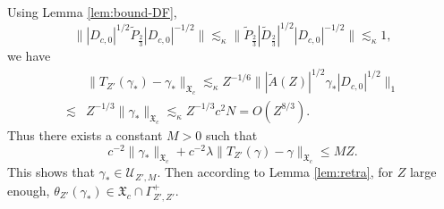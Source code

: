 \documentclass[a4paper]{amsart}
\def\cU{{\mathcal U}}
\def\gX{\mathfrak{X}}
\begin{document}
Using Lemma \ref{lem:bound-DF},
\begin{equation}\label{eq:4.2}
    \||D_{c,0}|^{1/2}\widetilde{P}_{\frac23} |D_{c,0}|^{-1/2}\|\lesssim_\kappa \|\widetilde{P}_{\frac23}|\widetilde{D}_{\frac23}|^{1/2} |D_{c,0}|^{-1/2}\|\lesssim_\kappa 1,
\end{equation}
we have
\begin{equation}\label{eq:T2/3-gamma}
  \begin{split}
    &\| T_{Z'}(\gamma_{*})-\gamma_{*}\|_{\gX_c}\lesssim_\kappa Z^{-1/6}\||\widetilde{A}(Z)|^{1/2} \gamma_*|D_{c,0}|^{1/2}\|_1\\
    \lesssim& Z^{-1/3}\|\gamma_*\|_{\gX_c}\lesssim_\kappa Z^{-1/3} c^2N =O(Z^{8/3}).
  \end{split}
\end{equation}
Thus there exists a constant $M>0$ such that
\begin{equation}
    c^{-2}\|\gamma_*\|_{\gX_c}+c^{-2}\lambda \|T_{Z'}(\gamma)-\gamma\|_{\gX_c}\leq MZ.
\end{equation}
This shows that $\gamma_*\in \cU_{Z',M}$. Then according to Lemma
\ref{lem:retra}, for $Z$ large enough,
$\theta_{Z'}(\gamma_*)\in\gX_c\cap \Gamma_{Z',Z'}^+$.
\end{document}
